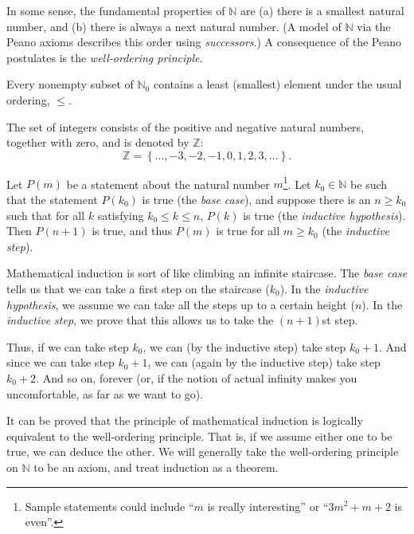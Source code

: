 \documentclass[english,course]{lecture}
\renewcommand{\le}{\leqslant}
\renewcommand{\ge}{\geqslant}
\theoremstyle{plain}
\newenvironment{definition}[1]
  {\renewcommand\theinnerdefinition{#1}\innerdefinition}
  {\endinnerdefinition}
\def\set#1{\left\{ {#1} \right\}}
\def\Z{{\mathbb Z}}
\def\N{{\mathbb N}}
\begin{document}
In some sense, the fundamental properties of $\N$ are (a) there is a smallest natural number, and (b) there is always a next natural number.
(A model of $\N$ via the Peano axioms describes this order using \emph{successors}.)
A consequence of the Peano postulates is the \emph{well-ordering principle}.


\begin{axiom}\label{axiom:wellordering}
	Every nonempty subset of $\N_0$ contains a least (smallest) element under the usual ordering, $\le$.
\end{axiom}


\begin{definition}\label{def:integers}\index{$\Z$}
	The set of integers consists of the positive and negative natural numbers, together with zero, and is denoted by $\Z$:
	\[
		\Z = \set{\ldots, -3, -2, -1, 0, 1, 2, 3, \ldots}.
	\]
\end{definition}





\begin{unnumberedtheorem}
	Let $P(m)$ be a statement about the natural number $m$\footnote{Sample statements could include ``$m$ is really interesting'' or ``$3m^2 + m + 2$ is even''.}.
	Let $k_0\in \N$ be such that the statement $P(k_0)$ is true (the \emph{base case}), and suppose there is an $n\ge k_0$ such that for all $k$ satisfying $k_0 \le k \le n$, $P(k)$ is true (the \emph{inductive hypothesis}).
	Then $P(n+1)$ is true, and thus $P(m)$ is true for all $m\ge k_0$ (the \emph{inductive step}).
\end{unnumberedtheorem}

Mathematical induction is sort of like climbing an infinite staircase.
The \emph{base case} tells us that we can take a first step on the staircase ($k_0$).
In the \emph{inductive hypothesis}, we assume we can take all the steps up to a certain height ($n$).
In the \emph{inductive step}, we prove that this allows us to take the $(n+1)$st step.

Thus, if we can take step $k_0$, we can (by the inductive step) take step $k_0 + 1$. And since we can take step $k_0 + 1$, we can (again by the inductive step) take step $k_0 + 2$. And so on, forever (or, if the notion of actual infinity makes you uncomfortable, as far as we want to go).

It can be proved that the principle of mathematical induction is logically equivalent to the well-ordering principle. 
That is, if we assume either one to be true, we can deduce the other.
We will generally take the well-ordering principle on $\N$ to be an axiom, and treat induction as a theorem.
\end{document}
